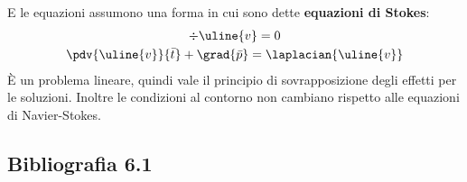 %
E le equazioni assumono una forma in cui sono dette \textbf{equazioni di Stokes}:
%
	\begin{equation*}
		\begin{gathered}
			\div{\uline{v}} = 0\\
			\pdv{ \uline{v} }{ \bar{t} } + \grad{\bar{p}} = \laplacian{\uline{v}}
		\end{gathered}
	\end{equation*} 
%
È un problema lineare, quindi vale il principio di sovrapposizione degli effetti per le soluzioni.
Inoltre le condizioni al contorno non cambiano rispetto alle equazioni di Navier-Stokes.

\subsection*{Bibliografia 6.1}
\cite[Cap.\ 10.4]{CengelCimbala}\\
\cite[Cap.\ 8.1, 9.1]{PnueliGutfinger}